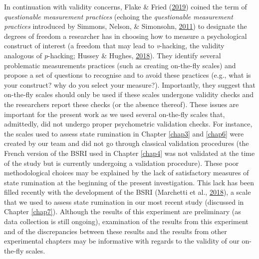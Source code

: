 \documentclass[a4paper,12pt,twoside,openright,oldfontcommands,final]{memoir}
\begin{document}
In continuation with validity concerns, Flake \& Fried (\protect\hyperlink{ref-flake_measurement_2019}{2019}) coined the term of \emph{questionable measurement practices} (echoing the \emph{questionable measurement practices} introduced by Simmons, Nelson, \& Simonsohn, \protect\hyperlink{ref-simmons_false-positive_2011}{2011}) to designate the degrees of freedom a researcher has in choosing how to measure a psychological construct of interest (a freedom that may lead to \emph{v}-hacking, the validity analogous of \emph{p}-hacking; Hussey \& Hughes, \protect\hyperlink{ref-hussey_hidden_2018}{2018}). They identify several problematic measurements practices (such as creating on-the-fly scales) and propose a set of questions to recognise and to avoid these practices (e.g., what is your construct? why do you select your measure?). Importantly, they suggest that on-the-fly scales should only be used if these scales undergone validity checks and the researchers report these checks (or the absence thereof). These issues are important for the present work as we used several on-the-fly scales that, admittedly, did not undergo proper psychometric validation checks. For instance, the scales used to assess state rumination in Chapter \ref{chap3} and \ref{chap6} were created by our team and did not go through classical validation procedures (the French version of the BSRI used in Chapter \ref{chap4} was not validated at the time of the study but is currently undergoing a validation procedure). These poor methodological choices may be explained by the lack of satisfactory measures of state rumination at the beginning of the present investigation. This lack has been filled recently with the development of the BSRI (Marchetti et al., \protect\hyperlink{ref-marchetti_brief_2018}{2018}), a scale that we used to assess state rumination in our most recent study (discussed in Chapter \ref{chap7}). Although the results of this experiment are preliminary (as data collection is still ongoing), examination of the results from this experiment and of the discrepancies between these results and the results from other experimental chapters may be informative with regards to the validity of our on-the-fly scales.
\end{document}

